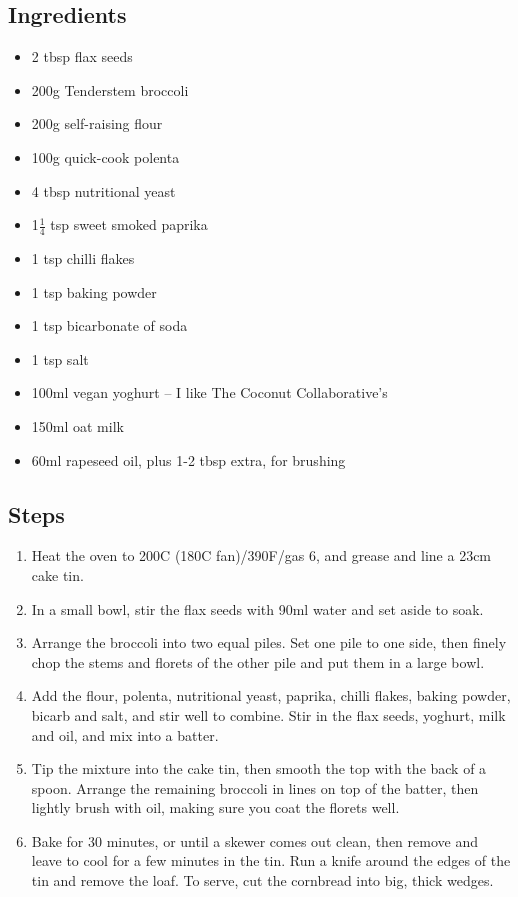 \documentclass{book}
\begin{document}
\subsection*{Ingredients}
\begin{itemize}
\item 2 tbsp flax seeds
\item 200g Tenderstem broccoli
\item 200g self-raising flour
\item 100g quick-cook polenta
\item 4 tbsp nutritional yeast 
\item 1$\frac{1}{4}$ tsp sweet smoked paprika
\item 1 tsp chilli flakes
\item 1 tsp baking powder
\item 1 tsp bicarbonate of soda
\item 1 tsp salt 
\item 100ml vegan yoghurt – I like The Coconut Collaborative’s
\item 150ml oat milk 
\item 60ml rapeseed oil, plus 1-2 tbsp extra, for brushing
\end{itemize}

\subsection*{Steps}
\begin{enumerate}
\item Heat the oven to 200C (180C fan)/390F/gas 6, and grease and line a 23cm cake tin.
\item In a small bowl, stir the flax seeds with 90ml water and set aside to soak.
\item Arrange the broccoli into two equal piles. Set one pile to one side, then finely chop the stems and florets of the other pile and put them in a large bowl.
\item  Add the flour, polenta, nutritional yeast, paprika, chilli flakes, baking powder, bicarb and salt, and stir well to combine. Stir in the flax seeds, yoghurt, milk and oil, and mix into a batter.
\item Tip the mixture into the cake tin, then smooth the top with the back of a spoon. Arrange the remaining broccoli in lines on top of the batter, then lightly brush with oil, making sure you coat the florets well.
\item Bake for 30 minutes, or until a skewer comes out clean, then remove and leave to cool for a few minutes in the tin. Run a knife around the edges of the tin and remove the loaf. To serve, cut the cornbread into big, thick wedges.
\end{enumerate}
\newpage
\end{document}
